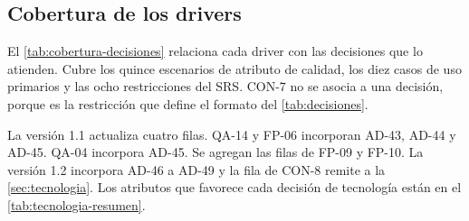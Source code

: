 \documentclass[11pt,letterpaper]{article}
\begin{document}
\subsection{Cobertura de los drivers}
\label{sec:cobertura}

El \cref{tab:cobertura-decisiones} relaciona cada driver con las decisiones que lo atienden. Cubre
los quince escenarios de atributo de calidad, los diez casos de uso primarios y las ocho
restricciones del SRS. CON-7 no se asocia a una decisión, porque es la restricción que define el
formato del \cref{tab:decisiones}.

La versión 1.1 actualiza cuatro filas. QA-14 y FP-06 incorporan AD-43, AD-44 y AD-45. QA-04
incorpora AD-45. Se agregan las filas de FP-09 y FP-10. La versión 1.2 incorpora AD-46 a AD-49 y
la fila de CON-8 remite a la \cref{sec:tecnologia}. Los atributos que favorece cada decisión de
tecnología están en el \cref{tab:tecnologia-resumen}.
\end{document}

